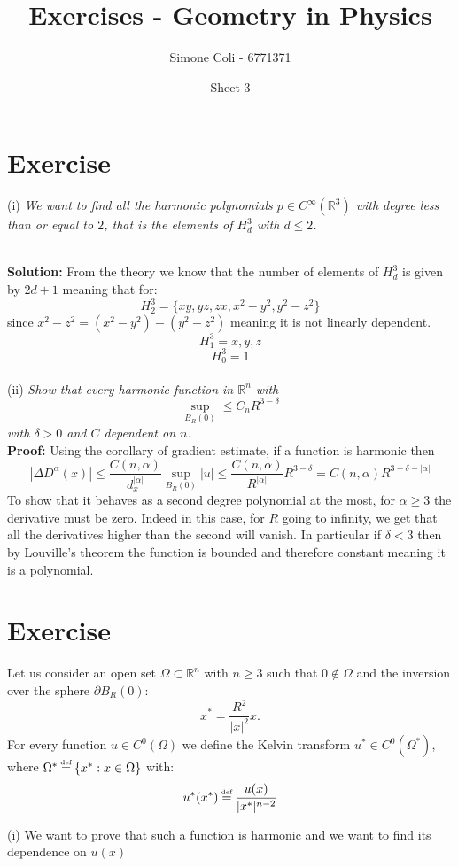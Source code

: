 \documentclass{article}
\title{Exercises - Geometry in Physics}
\author{Simone Coli - 6771371}
\date{Sheet 3}
\newcommand{\R}{\mathbb{R}}
\newcommand{\ex}{\textit}
\newcommand{\sol}{\\ \textbf{Solution: }}
\newcommand{\proof}{\\ \textbf{Proof: }}
\newcommand*{\eqdef}{\ensuremath{\overset{\mathclap{\text{\tiny def}}}{=}}}
\begin{document}
\maketitle

\section{Exercise}

(i) \ex{We want to find all the harmonic polynomials $p \in C^\infty(\R^3)$ with degree less than or equal to $2$, that is the elements of $H^3_d$ with $d\leq 2$.}

\sol From the theory we know that the number of elements of $H^3_d$ is given by $2d+1$ meaning that for:
\[
    H^3_2 = \{ xy, yz, zx, x^2-y^2, y^2-z^2 \}
\]
since $x^2-z^2 = (x^2-y^2)- (y^2-z^2)$ meaning it is not linearly dependent.
\[
    H^3_1 = {x,y,z}
\]
\[
    H^3_0 = {1}
\]\\
(ii) \ex{Show that every harmonic function in $\R^n$ with
\[
    \sup_{B_R(0)}\leq C_n R^{3-\delta}
\]
with $\delta>0$ and $C$ dependent on $n$.}
\proof Using the corollary of gradient estimate, if a function is harmonic then
\[
    |\Delta D^\alpha (x)| \leq \frac{C(n, \alpha)}{d_x^{|\alpha|}} \sup_{B_R(0)} |u| \leq \frac{C(n, \alpha)}{R^{|\alpha|}} R^{3-\delta} = C(n, \alpha) R^{3-\delta- |\alpha|}
\]
To show that it behaves as a second degree polynomial at the most, for $\alpha \geq 3$ the derivative must be zero. Indeed in this case, for $R$ going to infinity, we get that all the derivatives higher than the second will vanish. In particular if $\delta <3$ then by Louville's theorem the function is bounded and therefore constant meaning it is a polynomial.
\section{Exercise}

\begin{em}
Let us consider an open set $\Omega \subset \R^n$ with $n \geq 3$ such that $0 \notin \Omega$ and the inversion over the sphere $\partial B_R(0)$:
\begin{equation} \label{eq: sphere-inversion}
    x^* = \frac{R^2}{|x|^2}x .
\end{equation}
For every function $u \in C^0 (\Omega)$ we define the Kelvin transform $u^* \in C^0 (\Omega^*)$, where $\Omega^* \eqdef \{ x^* : x \in \Omega \}$ with:
\begin{equation} \label{eq:kelvin-transform}
    u^* (x^*) \eqdef \frac{u(x)}{|x^*|^{n-2}}
\end{equation}

(i) We want to prove that such a function is harmonic and we want to find its dependence on $u(x)$
\end{em}
\end{document}
